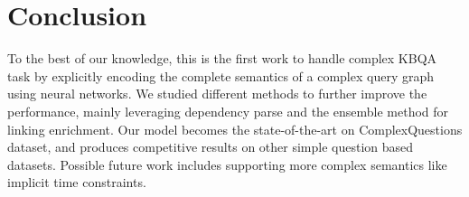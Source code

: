 \section{Conclusion}

To the best of our knowledge, this is the first work to handle
complex KBQA task by explicitly encoding the complete semantics of a complex query graph
using neural networks.
We studied different methods to further improve the performance,
mainly leveraging dependency parse and the ensemble method for linking enrichment.
Our model becomes the state-of-the-art on ComplexQuestions dataset,
and produces competitive results on other simple question based datasets.
Possible future work includes supporting more complex semantics like implicit time constraints.

